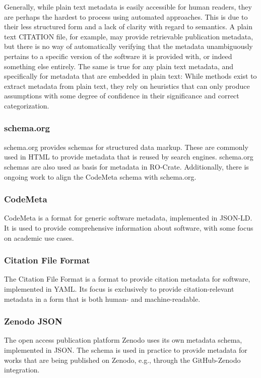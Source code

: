 \documentclass{article}
\begin{document}
Generally, while plain text metadata is easily accessible for human readers, they are perhaps the hardest to process using automated approaches. This is due to their less structured form and a lack of clarity with regard to semantics. A plain text CITATION file, for example, may provide retrievable publication metadata, but there is no way of automatically verifying that the metadata unambiguously pertains to a specific version of the software it is provided with, or indeed something else entirely. The same is true for any plain text metadata, and specifically for metadata that are embedded in plain text: While methods exist to extract metadata from plain text, they rely on heuristics that can only produce assumptions with some degree of confidence in their significance and correct categorization.



\subsubsection{schema.org}\label{oj15pg91jre}
schema.org\cite{138880/PI4Z5AFK} provides schemas for structured data markup. These are commonly used in HTML to provide metadata that is reused by search engines. schema.org schemas are also used as basis for metadata in RO-Crate\cite{138880/S5F3HZ96}. Additionally, there is ongoing work to align the CodeMeta schema\cite{138880/NBDB4VHJ} with schema.org.



\subsubsection{CodeMeta}\label{lbswhkf8pjyh}
CodeMeta \cite{138880/NBDB4VHJ} is a format for generic software metadata, implemented in JSON-LD. It is used to provide comprehensive information about software, with some focus on academic use cases.



\subsubsection{Citation File Format}\label{kjmmtpuqsfzj}
The Citation File Format \cite{138880/M4MT8YLA} is a format to provide citation metadata for software, implemented in YAML. Its focus is exclusively to provide citation-relevant metadata in a form that is both human- and machine-readable.



\subsubsection{Zenodo JSON}\label{xhmbao1xf7pk}
The open access publication platform Zenodo \cite{138880/BG42K9CX} uses its own metadata schema, implemented in JSON. The schema is used in practice to provide metadata for works that are being published on Zenodo, e.g., through the GitHub-Zenodo integration.
\end{document}

